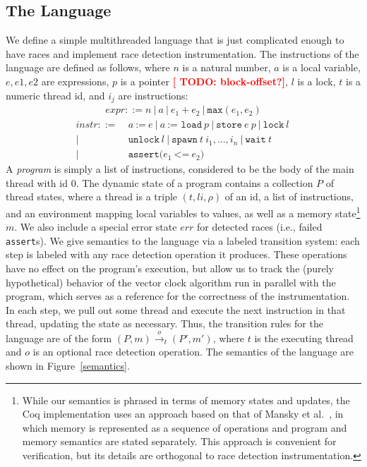 \documentclass[preprint, 10pt]{sigplanconf}
\newcommand{\TODO}[1]{\textbf{\textcolor{red}{[ TODO: #1]}}}
\newcommand{\assign}[2]{#1\ \texttt{:=}\ #2}
\newcommand{\load}[2]{#1\ \texttt{:= load}\ #2}
\newcommand{\store}[2]{\texttt{store}\ #2\ #1}
\newcommand{\lock}[1]{\texttt{lock}\ #1}
\newcommand{\unlock}[1]{\texttt{unlock}\ #1}
\newcommand{\spawn}[2]{\texttt{spawn}\ #1\ #2}
\newcommand{\wait}[1]{\texttt{wait}\ #1}
\newcommand{\assert}[2]{\texttt{assert(}#1\ \texttt{<=}\ #2\texttt{)}}
\newcommand{\exec}[5]{\ensuremath{(#1, #2) \xrightarrow{#4}_{#3} #5}}
\begin{document}
\subsection{The Language}
We define a simple multithreaded language that is just complicated enough to have races and implement race detection instrumentation. The instructions of the language are defined as follows, where $n$ is a natural number, $a$ is a local variable, $e, e1, e2$ are expressions, $p$ is a pointer \TODO{block-offset?}, $l$ is a lock, $t$ is a numeric thread id, and $i_j$ are instructions:
\begin{align*}\mathit{expr} ::= n~|~a~|~e_1 + e_2~|~\mathtt{max}(e_1, e_2)\end{align*}
\begin{align*}\mathit{instr} ::=\ &\assign{a}{e}~|~\load{a}{p}~|~\store{p}{e}~|~\lock{l}~\\|~&\unlock{l}~|~\spawn{t}{i_1, ..., i_n}~|~\wait{t}~\\|~&\assert{e_1}{e_2}\end{align*}
A \emph{program} is simply a list of instructions, considered to be the body of the main thread with id $0$. The dynamic state of a program contains a collection $P$ of thread states, where a thread is a triple $(t, \mathit{li}, \rho)$ of an id, a list of instructions, and an environment mapping local variables to values, as well as a memory state\footnote{While our semantics is phrased in terms of memory states and updates, the Coq implementation uses an approach based on that of Mansky et al.~\cite{memspec}, in which memory is represented as a sequence of operations and program and memory semantics are stated separately. This approach is convenient for verification, but its details are orthogonal to race detection instrumentation.} $m$. We also include a special error state $\mathit{err}$ for detected races (i.e., failed \texttt{assert}s). We give semantics to the language via a labeled transition system: each step is labeled with any race detection operation it produces. These operations have no effect on the program's execution, but allow us to track the (purely hypothetical) behavior of the vector clock algorithm run in parallel with the program, which serves as a reference for the correctness of the instrumentation. In each step, we pull out some thread and execute the next instruction in that thread, updating the state as necessary. Thus, the transition rules for the language are of the form \exec{P}{m}{t}{o}{(P', m')}, where $t$ is the executing thread and $o$ is an optional race detection operation. The semantics of the language are shown in Figure~\ref{semantics}.
\end{document}
